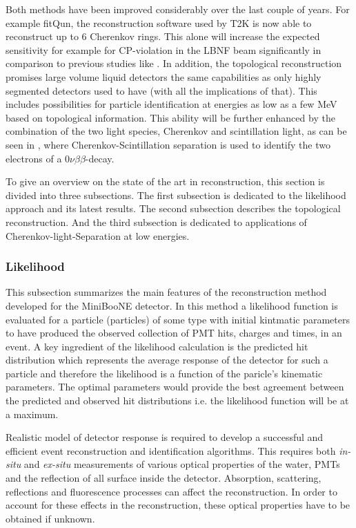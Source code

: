 Both methods have been improved considerably over the last couple of years. For example fitQun, the reconstruction software 
used by T2K is now able to reconstruct up to 6 Cherenkov rings. This alone will increase the expected sensitivity 
for example for CP-violation in the LBNF beam significantly in comparison to previous studies like \cite{Goon:2012if}. In addition, the 
topological reconstruction promises large volume liquid detectors the same capabilities as only highly segmented detectors 
used to have (with all the implications of that). This includes possibilities for particle identification at energies as low as
a few MeV based on topological information. This ability will be further enhanced by the combination of the two light species,
Cherenkov and scintillation light, as can be seen in \cite{Elagin:2016zgp}, where Cherenkov-Scintillation separation is used to
identify the two electrons of a 0$\nu\beta\beta$-decay.

To give an overview on the state of the art in reconstruction, this section is divided into three subsections. The first
subsection is dedicated to the likelihood approach and its latest results. The second subsection describes the topological 
reconstruction. And the third subsection is dedicated to applications of Cherenkov-light-Separation at low energies.

\subsubsection{Likelihood}

This subsection summarizes the main features of the reconstruction 
method developed for the MiniBooNE detector\cite{patt09}. In this 
method a likelihood function is evaluated for a particle (particles) of some type
with initial kintmatic parameters to have produced the observed collection 
of PMT hits, charges and times, in an event. A key ingredient 
of the likelihood calculation is the predicted hit distribution which 
represents the average response of the detector for such a particle and
therefore the likelihood is a function of the paricle's kinematic parameters. 
The optimal parameters would provide the best agreement between
the predicted and observed hit distributions i.e. the likelihood
function will be at a maximum.

Realistic model of detector response is required to develop a
successful and efficient event reconstruction and identification algorithms.
This requires both {\it in-situ} and {\it ex-situ} measurements
of various optical properties of the water, PMTs and the reflection
of all surface inside the detector. Absorption, scattering, reflections
and fluorescence processes can affect the reconstruction.
In order to account for these effects in the reconstruction,
these optical properties have to be obtained if unknown. 

